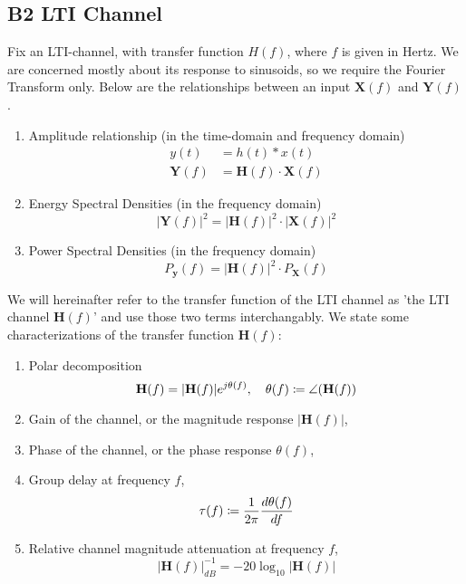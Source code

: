 \documentclass[../../main.tex]{subfiles}
\begin{document}
\newcommand{\pxf}{P_{\mathbf{X}}(f)}
\newcommand{\pyf}{P_{\mathbf{y}}(f)}
\newcommand{\hf}{\mathbf{H}(f)}
\newcommand{\xf}{\mathbf{X}(f)}
\newcommand{\yf}{\mathbf{Y}(f)}
\subsection{B2 LTI Channel}
Fix an LTI-channel, with transfer function $H(f)$, where $f$ is given in Hertz. We are concerned mostly about its response to sinusoids, so we require the Fourier Transform only. Below are the relationships between an input $\mathbf{X}(f)$ and $\mathbf{Y}(f)$.
\begin{enumerate}
    \item Amplitude relationship (in the time-domain and frequency domain)
    \begin{align*}
        y(t)&=h(t)\ast x(t)\\[2ex]
        \yf&=\mathbf{H}(f)\cdot\xf
    \end{align*}
    \item Energy Spectral Densities (in the frequency domain)
        \[
        |\yf|^2=|\mathbf{H}(f)|^2\cdot|\xf|^2
        \]
    \item Power Spectral Densities (in the frequency domain)
        \[
        \pyf = |\mathbf{H}(f)|^2\cdot\pxf
        \]
\end{enumerate}
We will hereinafter refer to the transfer function of the LTI channel as 'the LTI channel $\hf$' and use those two terms interchangably. We state some characterizations of the transfer function $\hf$:
\begin{enumerate}
    \item Polar decomposition
    \[
    \hf =|\hf|e^{j\theta(f)},\quad\theta(f)\defined\angle(\hf)
    \]
    \item Gain of the channel, or the magnitude response $|\hf|$,
    \item Phase of the channel, or the phase response $\theta(f)$,
    \item Group delay at frequency $f$,
    \[
    \tau(f)\coloneqq \dfrac{1}{2\pi}\dfrac{d\theta(f)}{df}
    \]
    \item Relative channel magnitude attenuation at frequency $f$,
    \[
    |\hf|_{dB}^{-1} = -20\log_{10}|\hf|
    \]
\end{enumerate}
\end{document}
